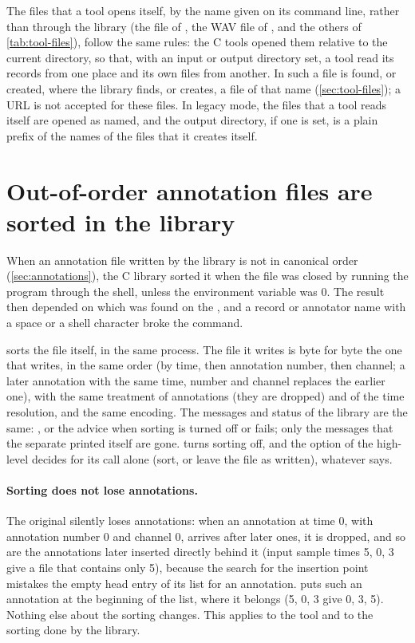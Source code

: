 The files that a tool opens itself, by the name given on its command line,
rather than through the library (the  file of , the WAV
file of , and the others of \cref{tab:tool-files}), follow the
same rules: the C tools opened them relative to the current directory, so
that, with an input or output directory set, a tool read its records from
one place and its own files from another. In \wfdbx{} such a file is found,
or created, where the library finds, or creates, a file of that name
(\cref{sec:tool-files}); a URL is not accepted for these files. In legacy
mode, the files that a tool reads itself are opened as named, and the
output directory, if one is set, is a plain prefix of the names of the
files that it creates itself.

\section{Out-of-order annotation files are sorted in the library}
\label{sec:sorting}

When an annotation file written by the library is not in canonical order
(\cref{sec:annotations}), the C library sorted it when the file was closed by
running the  program through the shell, unless the environment
variable  was 0. The result then depended on which
 was found on the , and a record or annotator name
with a space or a shell character broke the command.

\wfdbx{} sorts the file itself, in the same process. The file it writes is
byte for byte the one that  writes, in the same order (by time,
then annotation number, then channel; a later annotation with the same
time, number and channel replaces the earlier one), with the same treatment
of  annotations (they are dropped) and of the time resolution,
and the same encoding. The messages and status of the library are the same:
, or the
advice  when sorting is turned
off or fails; only the messages that the separate  printed
itself are gone.  turns sorting off, and the
 option of the high-level  decides for
its call alone (sort, or leave the file as written), whatever
 says.

\paragraph{Sorting does not lose annotations.} The original 
silently loses annotations: when an annotation at time 0, with annotation
number 0 and channel 0, arrives after later ones, it is dropped, and so are
the annotations later inserted directly behind it (input sample times 5, 0,
3 give a file that contains only 5), because the search for the insertion
point mistakes the empty head entry of its list for an annotation. \wfdbx{}
puts such an annotation at the beginning of the list, where it belongs (5,
0, 3 give 0, 3, 5). Nothing else about the sorting changes. This applies to
the  tool and to the sorting done by the library.

